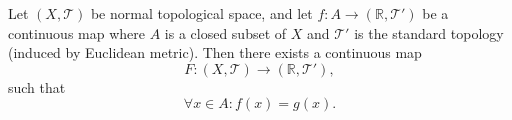 \begin{proposition}
	\label{prop: Tietze extension theorem}
	Let $(X, \mathcal T)$ be normal topological space, and let $f: A \to (\mathbb R, \mathcal T')$ be a continuous map where $A$ is a closed subset of $X$ and $\mathcal T'$ is the standard topology (induced by Euclidean metric). Then there exists a continuous map
	$$
	F: (X, \mathcal T) \to (\mathbb R, \mathcal T'),
	$$
	such that
	$$
	\forall x \in A: f(x) = g(x).
	$$
\end{proposition}







































%
